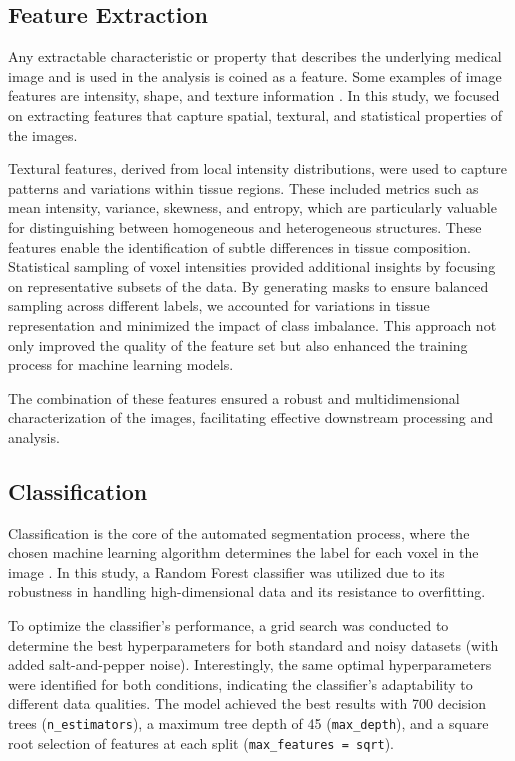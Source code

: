 \subsection{Feature Extraction}

Any extractable characteristic or property that describes the underlying medical image and is used in the analysis is coined as a feature. Some examples of image features are intensity, shape, and texture information \cite{b8}. In this study, we focused on extracting features that capture spatial, textural, and statistical properties of the images.

Textural features, derived from local intensity distributions, were used to capture patterns and variations within tissue regions. These included metrics such as mean intensity, variance, skewness, and entropy, which are particularly valuable for distinguishing between homogeneous and heterogeneous structures. These features enable the identification of subtle differences in tissue composition. Statistical sampling of voxel intensities provided additional insights by focusing on representative subsets of the data. By generating masks to ensure balanced sampling across different labels, we accounted for variations in tissue representation and minimized the impact of class imbalance. This approach not only improved the quality of the feature set but also enhanced the training process for machine learning models.

The combination of these features ensured a robust and multidimensional characterization of the images, facilitating effective downstream processing and analysis.

\subsection{Classification}

Classification is the core of the automated segmentation process, where the chosen machine learning algorithm determines the label for each voxel in the image \cite{b8}. In this study, a Random Forest classifier was utilized due to its robustness in handling high-dimensional data and its resistance to overfitting.

To optimize the classifier’s performance, a grid search was conducted to determine the best hyperparameters for both standard and noisy datasets (with added salt-and-pepper noise). Interestingly, the same optimal hyperparameters were identified for both conditions, indicating the classifier’s adaptability to different data qualities. The model achieved the best results with 700 decision trees (\texttt{n\_estimators}), a maximum tree depth of 45 (\texttt{max\_depth}), and a square root selection of features at each split (\texttt{max\_features = sqrt}).

